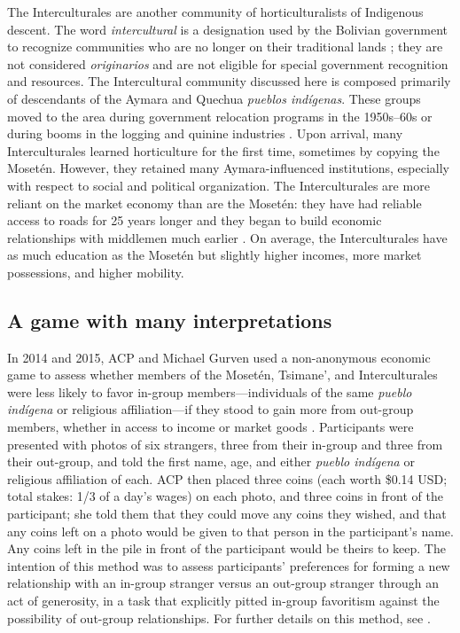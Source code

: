 \documentclass[bibauthoryear]{aa}
\begin{document}
The Interculturales are another community of horticulturalists of Indigenous descent. The word \textit{intercultural} is a designation used by the Bolivian government to recognize communities who are no longer on their traditional lands \citep{albo2007bolivia}; they are not considered \textit{originarios} and are not eligible for special government recognition and resources. The Intercultural community discussed here is composed primarily of descendants of the Aymara and Quechua \textit{pueblos ind\'igenas}. These groups moved to the area during government relocation programs in the 1950s--60s or during booms in the logging and quinine industries  \citep{pisor2016risk, pisor2018diversify}. Upon arrival, many Interculturales learned horticulture for the first time, sometimes by copying the Moset\'en. However, they retained many Aymara-influenced institutions, especially with respect to social and political organization. The Interculturales are more reliant on the market economy than are the Moset\'en: they have had reliable access to roads for 25 years longer \citep{Llojlla2011} and they began to build economic relationships with middlemen much earlier \citep{pisorjones2020}. On average, the Interculturales have as much education as the Moset\'en but slightly higher incomes, more market possessions, and higher mobility. %
		  

\subsection{A game with many interpretations}\label{boliviagame}

In 2014 and 2015, ACP and Michael Gurven used a non-anonymous economic game to assess whether members of the Moset\'en, Tsimane', and Interculturales were less likely to favor in-group members---individuals of the same \textit{pueblo ind\'igena} or religious affiliation---if they stood to gain more from out-group members, whether in access to income or  market goods \citep{pisor2016risk, pisor2018diversify}. %
 Participants were presented with photos of six strangers, three from their in-group and three from their out-group, and told the first name, age, and either \textit{pueblo ind\'igena} or religious affiliation of each. ACP then placed three coins (each worth \$0.14 USD; total stakes: 1/3 of a day's wages) on each photo, and three coins in front of the participant; she told them that they could move any coins they wished, and that any coins left on a photo would be given to that person in the participant's name. Any coins left in the pile in front of the participant would be theirs to keep. The intention of this method was to assess participants' preferences for forming a new relationship with an in-group stranger versus an out-group stranger through an act of generosity, in a task that explicitly pitted in-group favoritism against the possibility of out-group relationships. For further details on this method, see \citet{pisor2016risk, pisor2018diversify}.
\end{document}
